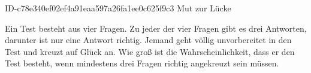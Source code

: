 \begin{exercise}
      {ID-c78e340ef02ef4a91eaa597a26fa1ee0c625f9c3}
      {Mut zur Lücke}
  \ifproblem\problem\par
    Ein Test besteht aus vier Fragen. Zu jeder der vier Fragen gibt es drei
    Antworten, darunter ist nur eine Antwort richtig. Jemand geht völlig
    unvorbereitet in den Test und kreuzt auf Glück an. Wie groß ist die
    Wahrscheinlichkeit, dass er den Test besteht, wenn mindestens drei Fragen
    richtig angekreuzt sein müssen.
  \fi
\end{exercise}
